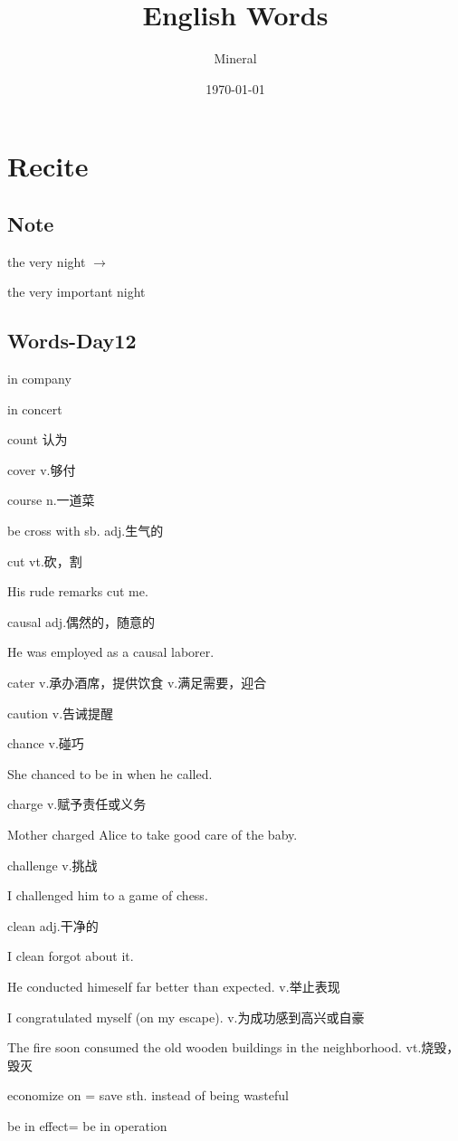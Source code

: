 \documentclass[utf8]{ctexart}
\author{Mineral}
\title{English Words}
\date {\today}
\begin{document}
	\maketitle
	\section{Recite}
	\subsection{Note}
	\par the very night $\to $
	\par the very important night	 
	
	\subsection{Words-Day12}
	\par in company 
	\par in concert 	
	\par count 认为
	\par cover v.够付
	\par course n.一道菜
	\par be cross with sb. adj.生气的
	\par cut vt.砍，割
	\par His rude remarks cut me.
	\par causal adj.偶然的，随意的
	\par He was employed as a causal laborer.											
	\par cater v.承办酒席，提供饮食  v.满足需要，迎合
	\par caution v.告诫提醒
	\par chance v.碰巧
	\par She chanced to be in when he called.
	\par charge v.赋予责任或义务
	\par Mother charged Alice to take good care of the baby.
	\par challenge v.挑战
	\par I challenged him to a game of chess.
	\par clean adj.干净的
	\par I clean forgot about it.
	\par He conducted himeself far better than expected. v.举止表现
	\par I congratulated myself (on my escape). v.为成功感到高兴或自豪
	\par The fire soon consumed the old wooden buildings in the neighborhood. vt.烧毁，毁灭
	\par economize on = save sth. instead of being wasteful
	\par be in effect= be in operation					
\end{document}

